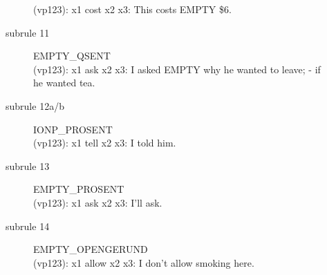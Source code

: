 \begin{description}
\begin{description}
  (vp123): x1 cost x2 x3: This costs EMPTY \$6. \\
\item[subrule 11] EMPTY\_QSENT\\
  (vp123): x1 ask x2 x3: I asked EMPTY why he wanted to leave; - if he wanted 
tea.
\item[subrule 12a/b] IONP\_PROSENT\\
  (vp123): x1 tell x2 x3: I told him.
\item[subrule 13] EMPTY\_PROSENT\\
  (vp123): x1 ask x2 x3: I'll ask.
\item[subrule 14] EMPTY\_OPENGERUND\\
  (vp123): x1 allow x2 x3: I don't allow smoking here.\\
\end{description}
\end{description}


